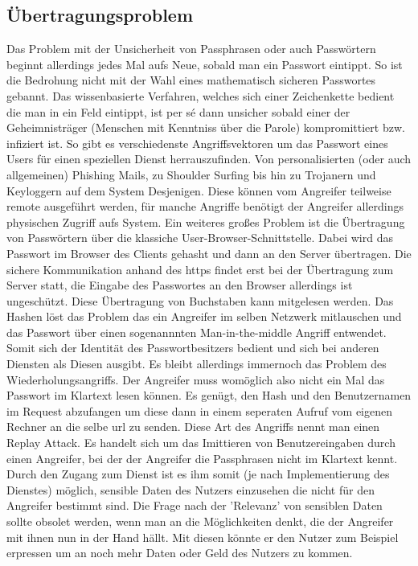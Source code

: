 \subsection{Übertragungsproblem}
Das Problem mit der Unsicherheit von Passphrasen oder auch Passwörtern beginnt allerdings jedes Mal aufs Neue, sobald man ein Passwort eintippt. So ist die Bedrohung nicht mit der Wahl eines mathematisch sicheren Passwortes gebannt. Das wissenbasierte Verfahren, welches sich einer Zeichenkette bedient die man in ein Feld eintippt, ist per sé dann unsicher sobald einer der Geheimnisträger (Menschen mit Kenntniss über die Parole) kompromittiert bzw. infiziert ist. So gibt es verschiedenste Angriffsvektoren um das Passwort eines Users für einen speziellen Dienst herrauszufinden. Von personalisierten (oder auch allgemeinen) Phishing Mails, zu Shoulder Surfing bis hin zu Trojanern und Keyloggern auf dem System Desjenigen. Diese können vom Angreifer teilweise remote ausgeführt werden, für manche Angriffe benötigt der Angreifer allerdings physischen Zugriff aufs System. Ein weiteres großes Problem ist die Übertragung von Passwörtern über die klassiche User-Browser-Schnittstelle. Dabei wird das Passwort im Browser des Clients gehasht und dann an den Server übertragen. Die sichere Kommunikation anhand des \ac{https} findet erst bei der Übertragung zum Server statt, die Eingabe des Passwortes an den Browser allerdings ist ungeschützt. Diese Übertragung von Buchstaben kann mitgelesen werden. Das Hashen löst das Problem das ein Angreifer im selben Netzwerk mitlauschen und das Passwort über einen sogenannnten Man-in-the-middle Angriff entwendet. Somit sich der Identität des Passwortbesitzers bedient und sich bei anderen Diensten als Diesen ausgibt. Es bleibt allerdings immernoch das Problem des Wiederholungsangriffs. Der Angreifer muss womöglich also nicht ein Mal das Passwort im Klartext lesen können. Es genügt, den Hash und den Benutzernamen im Request abzufangen um diese dann in einem seperaten Aufruf vom eigenen Rechner an die selbe \ac{url} zu senden. Diese Art des Angriffs nennt man einen Replay Attack. Es handelt sich um das Imittieren von Benutzereingaben durch einen Angreifer, bei der der Angreifer die Passphrasen nicht im Klartext kennt.
Durch den Zugang zum Dienst ist es ihm somit (je nach Implementierung des Dienstes) möglich, sensible Daten des Nutzers einzusehen die nicht für den Angreifer bestimmt sind. Die Frage nach der 'Relevanz' von sensiblen Daten sollte obsolet werden, wenn man an die Möglichkeiten denkt, die der Angreifer mit ihnen nun in der Hand hällt. Mit diesen könnte er den Nutzer zum Beispiel erpressen um an noch mehr Daten oder Geld des Nutzers zu kommen.

